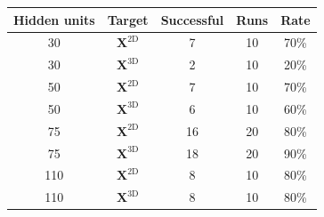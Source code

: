 \begin{tabular}{ccccc}
\hline
Hidden units & Target & Successful & Runs & Rate \\
\hline
30 & $\boldsymbol{X}^{\mathrm{2D}}$ & 7 & 10 & 70\% \\
30 & $\boldsymbol{X}^{\mathrm{3D}}$ & 2 & 10 & 20\% \\
50 & $\boldsymbol{X}^{\mathrm{2D}}$ & 7 & 10 & 70\% \\
50 & $\boldsymbol{X}^{\mathrm{3D}}$ & 6 & 10 & 60\% \\
75 & $\boldsymbol{X}^{\mathrm{2D}}$ & 16 & 20 & 80\% \\
75 & $\boldsymbol{X}^{\mathrm{3D}}$ & 18 & 20 & 90\% \\
110 & $\boldsymbol{X}^{\mathrm{2D}}$ & 8 & 10 & 80\% \\
110 & $\boldsymbol{X}^{\mathrm{3D}}$ & 8 & 10 & 80\% \\
\hline
\end{tabular}

